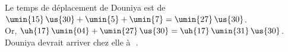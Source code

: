    Le temps de déplacement de Douniya est de \\
   $\umin{15}\,\us{30}+\umin{5}+\umin{7} =\umin{27}\,\us{30}$. \\
   Or, $\uh{17}\,\umin{04}+\umin{27}\,\us{30} =\uh{17}\,\umin{31}\,\us{30}$. \\
   {\blue Douniya devrait arriver chez elle à \,\,}. \\
